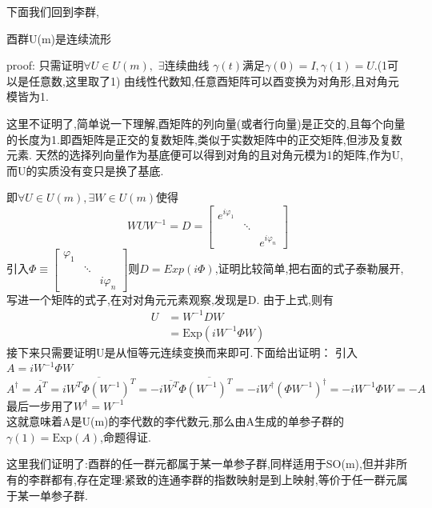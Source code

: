 \documentclass[../main.tex]{subfiles}
\begin{document}
 下面我们回到李群,
 \begin{theorem}
     酉群U(m)是连续流形
 \end{theorem}
 proof: 只需证明$\forall U \in U(m),$ $\exists$连续曲线 $\gamma(t)$满足$\gamma(0) = I,\gamma(1) = U$.(1可以是任意数,这里取了1)
 由线性代数知,任意酉矩阵可以酉变换为对角形,且对角元模皆为1.
 \begin{note}
 这里不证明了,简单说一下理解,酉矩阵的列向量(或者行向量)是正交的,且每个向量的长度为1.即酉矩阵是正交的复数矩阵,类似于实数矩阵中的正交矩阵,但涉及复数元素.
 天然的选择列向量作为基底便可以得到对角的且对角元模为1的矩阵,作为U,而U的实质没有变只是换了基底.
 \end{note}
 即$\forall U \in U(m),\exists W \in U(m)$使得
 $$WUW^{-1} = D = \begin{bmatrix}
     e^{i\varphi_1}&&\\
     &\ddots &\\
     &&e^{i\varphi_{n}}
 \end{bmatrix}$$
 引入$\Phi \equiv \begin{bmatrix}
     \varphi_1&&\\
     &\ddots &\\
     &&i\varphi_{n}
 \end{bmatrix}$则$D = Exp(i\Phi)$,证明比较简单,把右面的式子泰勒展开,写进一个矩阵的式子,在对对角元元素观察,发现是D.
 由于上式,则有
 \begin{align*}
     U&=W^{-1}DW\\
      &=\text{Exp}(iW^{-1}\Phi W)
 \end{align*}
 接下来只需要证明U是从恒等元连续变换而来即可.下面给出证明：
 引入$A = iW^{-1}\Phi W$
 $$A^\dagger = \overline{A^T} = \overline{iW^T \Phi (W^{-1})^T} = -i \overline{W^T} \Phi \overline{(W^{-1})^T} = -iW^\dagger (\Phi W^{-1})^{\dagger} = -iW^{-1}\Phi W = -A$$
 最后一步用了$W^\dagger = W^{-1}$\\
 这就意味着A是U(m)的李代数的李代数元,那么由A生成的单参子群的$\gamma(1) = \text{Exp}(A)$,命题得证.
 \begin{note}
     这里我们证明了:酉群的任一群元都属于某一单参子群,同样适用于SO(m),但并非所有的李群都有,存在定理:紧致的连通李群的指数映射是到上映射,等价于任一群元属于某一单参子群.
 \end{note}
\end{document}
